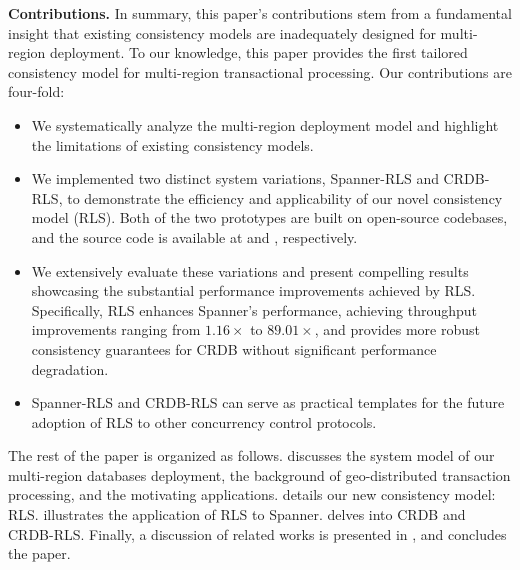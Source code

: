 \vspace{3pt}
\noindent\textbf{Contributions.} In summary, this paper's contributions stem from a fundamental insight that existing consistency models are inadequately designed for multi-region deployment. To our knowledge, this paper provides the first tailored consistency model for multi-region transactional processing. Our contributions are four-fold: 

\vspace{3pt}
\begin{itemize}[leftmargin=*, itemsep=3pt]
\setlength{\parsep}{0pt}
\setlength{\parskip}{0pt}
\setlength{\parindent}{1em}
  \item We systematically analyze the multi-region deployment model and highlight the limitations of existing consistency models.
  \item We implemented two distinct system variations, Spanner-RLS and CRDB-RLS, to demonstrate the efficiency and applicability of our novel consistency model (RLS). Both of the two prototypes are built on open-source codebases, and the source code is available at {} and {}, respectively.
  \item We extensively evaluate these variations and present compelling results showcasing the substantial performance improvements achieved by RLS. Specifically, RLS enhances Spanner's performance, achieving throughput improvements ranging from $1.16\times$ to $89.01\times$, and provides more robust consistency guarantees for CRDB without significant performance degradation.
  \item Spanner-RLS and CRDB-RLS can serve as practical templates for the future adoption of RLS to other concurrency control protocols.
\end{itemize}
\vspace{6pt}


The rest of the paper is organized as follows.  discusses the system model of our multi-region databases deployment, the background of geo-distributed transaction processing, and the motivating applications.  details our new consistency model: RLS.  illustrates the application of RLS to Spanner.   delves into CRDB and CRDB-RLS. Finally, a discussion of related works is presented in  , and   concludes the paper.

